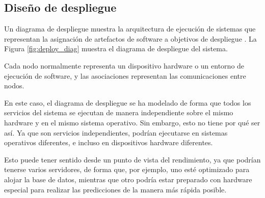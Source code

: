 \subsection{Diseño de despliegue}

Un diagrama de despliegue muestra la arquitectura de ejecución de sistemas que representan la asignación
de artefactos de software a objetivos de despliegue \cite{arlow2005uml}. La Figura \ref{fig:deploy_diag} muestra el 
diagrama de despliegue del sistema.

Cada nodo normalmente representa un dispositivo hardware o un entorno de ejecución de software, y las asociaciones 
representan las comunicaciones entre nodos.


En este caso, el diagrama de despliegue se ha modelado de forma que todos los servicios del sistema se ejecutan
de manera independiente sobre el mismo hardware y en el mismo sistema operativo. Sin embargo, esto no tiene por
qué ser así. Ya que son servicios independientes, podrían ejecutarse en sistemas operativos diferentes, e 
incluso en dispositivos hardware diferentes. 

Esto puede tener sentido desde un punto de vista del rendimiento, 
ya que podrían tenerse varios servidores, de forma que, por ejemplo, uno esté optimizado para alojar la base de 
datos, mientras que otro podría estar preparado con hardware especial para realizar las predicciones de la manera 
más rápida posible.